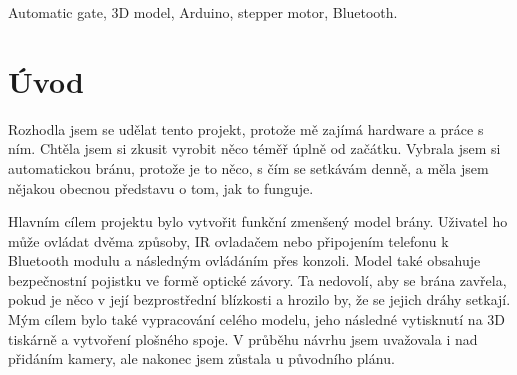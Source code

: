 \documentclass[12pt, a4paper,
twoside,        %
openright
]{report}
\begin{document}
	\vspace{18pt}
	
	
	\noindent  Automatic gate, 3D model, Arduino, stepper motor, Bluetooth.
	
	\clearpage %
	
	
	\tableofcontents %
	
	\setcounter{page}{1} %
	
	\chapter*{Úvod}
	Rozhodla jsem se udělat tento projekt, protože mě zajímá hardware a práce s ním. Chtěla jsem si zkusit vyrobit něco téměř úplně od začátku. Vybrala jsem si automatickou bránu, protože je to něco, s čím se setkávám denně, a měla jsem nějakou obecnou představu o tom, jak to funguje. 
	
	Hlavním cílem projektu bylo vytvořit funkční zmenšený model brány. Uživatel ho může ovládat dvěma způsoby, IR ovladačem nebo připojením telefonu k Bluetooth modulu a následným ovládáním přes konzoli. Model také obsahuje bezpečnostní pojistku ve formě optické závory. Ta nedovolí, aby se brána zavřela, pokud je něco v její bezprostřední blízkosti a hrozilo by, že se jejich dráhy setkají. Mým cílem bylo také vypracování celého modelu, jeho následné vytisknutí na 3D tiskárně a vytvoření plošného spoje. V průběhu návrhu jsem uvažovala i nad přidáním kamery, ale nakonec jsem zůstala u původního plánu. 
	
\end{document}
